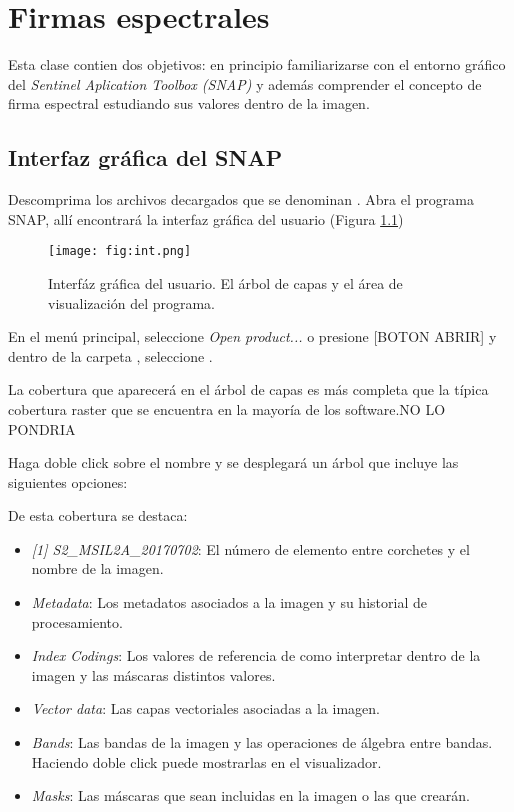 \chapter{Firmas espectrales}
Esta clase contien dos objetivos: en principio familiarizarse con el entorno gráfico del \emph{Sentinel Aplication Toolbox (SNAP)} y además comprender el concepto de firma espectral estudiando sus valores dentro de la imagen.

\section{Interfaz gráfica del SNAP}

Descomprima los archivos decargados que se denominan . Abra el programa SNAP, allí encontrará la interfaz gráfica del usuario (Figura \ref{fig:int})

\begin{figure}[h!]
    \centering
    \texttt{[image: fig:int.png]}
    \caption{Interfáz gráfica del usuario. El árbol de capas y el área de visualización del programa.}
    \label{fig:int}
\end{figure}

En el menú principal, seleccione \emph{Open product...} o presione [BOTON ABRIR] y dentro de la carpeta , seleccione .

La cobertura que aparecerá en el árbol de capas es más completa que la típica cobertura raster que se encuentra en la mayoría de los software.NO LO PONDRIA

Haga doble click sobre el nombre y se desplegará un árbol que incluye las siguientes opciones:

De esta cobertura se destaca:

\begin{itemize}
    \item \emph{[1] S2\_MSIL2A\_20170702}: El número de elemento entre corchetes y el nombre de la imagen.
    \item \emph{Metadata}: Los metadatos asociados a la imagen y su historial de procesamiento.
    \item \emph{Index Codings}: Los valores de referencia de como interpretar dentro de la imagen y las máscaras distintos valores.
    \item \emph{Vector data}: Las capas vectoriales asociadas a la imagen.
    \item \emph{Bands}: Las bandas de la imagen y las operaciones de álgebra entre bandas. Haciendo doble click puede mostrarlas en el visualizador.
    \item \emph{Masks}: Las máscaras que sean incluidas en la imagen o las que crearán.
\end{itemize}


